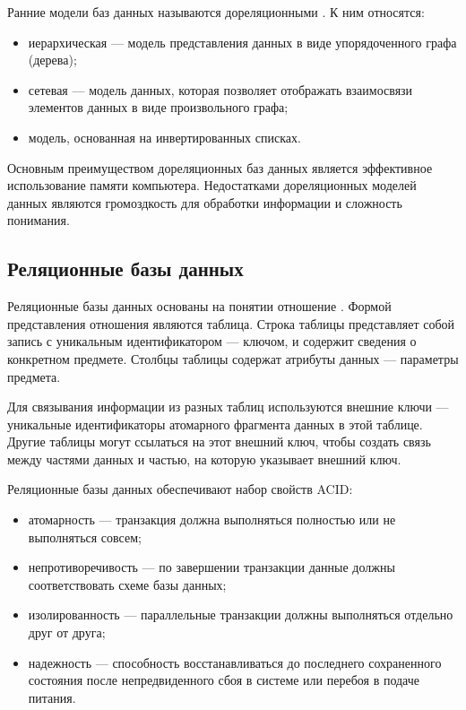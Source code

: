 Ранние модели баз данных называются дореляционными \cite{before}. К ним относятся:

\begin{itemize}
	\item иерархическая --- модель представления данных в виде упорядоченного графа (дерева);
	\item сетевая --- модель данных, которая позволяет отображать взаимосвязи элементов данных в виде произвольного графа;
	\item модель, основанная на инвертированных списках.
\end{itemize}

Основным преимуществом дореляционных баз данных является эффективное использование памяти компьютера. Недостатками дореляционных моделей данных являются громоздкость для обработки информации и сложность понимания.

\subsection{Реляционные базы данных}

Реляционные базы данных основаны на понятии отношение \cite{before}. Формой представления отношения являются таблица. Строка таблицы представляет собой запись с уникальным идентификатором --- ключом, и содержит сведения о конкретном предмете. Столбцы таблицы содержат атрибуты данных --- параметры предмета.

Для связывания информации из разных таблиц используются внешние ключи --- уникальные идентификаторы атомарного фрагмента данных в этой таблице. Другие таблицы могут ссылаться на этот внешний ключ, чтобы создать связь между частями данных и частью, на которую указывает внешний ключ.

Реляционные базы данных обеспечивают набор свойств ACID:

\begin{itemize}
	\item атомарность --- транзакция должна выполняться полностью или не выполняться совсем;
	\item непротиворечивость --- по завершении транзакции данные должны соответствовать схеме базы данных;
	\item изолированность --- параллельные транзакции должны выполняться отдельно друг от друга;
	\item надежность --- способность восстанавливаться до последнего сохраненного состояния после непредвиденного сбоя в системе или перебоя в подаче питания.
\end{itemize}


